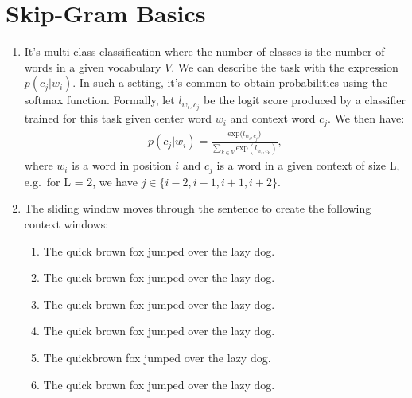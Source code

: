 \documentclass[11pt,a4paper]{article}
\begin{document}
\section{Skip-Gram Basics}

\begin{enumerate}[label=(\alph*)]
    \item It's multi-class classification where the number of classes is the
          number of words in a given vocabulary $V$.
          We can describe the task with the expression $p(c_j|w_i)$.
          In such a setting, it's common to obtain probabilities using the
          softmax function.
          Formally, let $l_{w_i,c_j}$ be the logit score produced by a
          classifier trained for this task given center word $w_i$ and context
          word $c_j$.
          We then have:
          \begin{align*}
              p(c_j|w_i) = \frac{\text{exp}{(l_{w_i,c_j}})}{\sum_{k\in V}\text{exp}(l_{w_i,c_k})},
          \end{align*}
          where $w_i$ is a word in position $i$ and $c_j$ is a word in a given
          context of size L, e.g.\ for L = 2, we have
          $j\in\{i-2, i-1,i+1,i+2\}$.
    \item The sliding window moves through the sentence to create the following
          context windows:
          \begin{enumerate}[label=(\arabic*)]
              \item \colorbox{green!30}{The} \colorbox{yellow!30}{quick}  \colorbox{yellow!30}{brown} fox jumped over the lazy dog.
              \item \colorbox{yellow!30}{The} \colorbox{green!30}{quick} \colorbox{yellow!30}{brown} \colorbox{yellow!30}{fox} jumped over the lazy dog.
              \item \colorbox{yellow!30}{The} \colorbox{yellow!30}{quick} \colorbox{green!30}{brown} \colorbox{yellow!30}{fox} \colorbox{yellow!30}{jumped} over the lazy dog.
              \item The \colorbox{yellow!30}{quick} \colorbox{yellow!30}{brown} \colorbox{green!30}{fox} \colorbox{yellow!30}{jumped} \colorbox{yellow!30}{over} the lazy dog.
              \item The quick\colorbox{yellow!30}{brown} \colorbox{yellow!30}{fox} \colorbox{green!30}{jumped} \colorbox{yellow!30}{over} \colorbox{yellow!30}{the} lazy dog.
              \item The quick brown \colorbox{yellow!30}{fox} \colorbox{yellow!30}{jumped} \colorbox{green!30}{over} \colorbox{yellow!30}{the} \colorbox{yellow!30}{lazy} dog.

\end{enumerate}
\end{enumerate}
\end{document}

